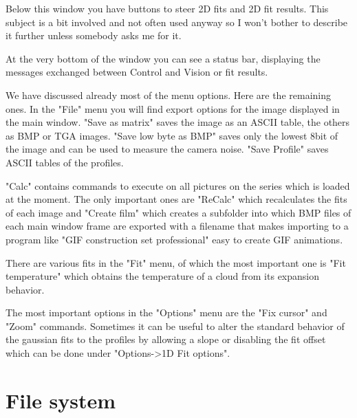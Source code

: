 \documentclass[10pt]{article}
\begin{document}
Below this window you have buttons to steer 2D fits and 2D fit
results. This subject is a bit involved and not often used anyway
so I won't bother to describe it further unless somebody asks me
for it.

At the very bottom of the window you can see a status bar,
displaying the messages exchanged between Control and Vision or
fit results.

We have discussed already most of the menu options. Here are the
remaining ones. In the "File" menu you will find export options
for the image displayed in the main window. "Save as matrix" saves
the image as an ASCII table, the others as BMP or TGA images.
"Save low byte as BMP" saves only the lowest 8bit of the image and
can be used to measure the camera noise. "Save Profile" saves
ASCII tables of the profiles.

"Calc" contains commands to execute on all pictures on the series
which is loaded at the moment. The only important ones are
"ReCalc" which recalculates the fits of each image and "Create
film" which creates a subfolder into which BMP files of each main
window frame are exported with a filename that makes importing to
a program like "GIF construction set professional" easy to create
GIF animations.

There are various fits in the "Fit" menu, of which the most
important one is "Fit temperature" which obtains the temperature
of a cloud from its expansion behavior.

The most important options in the "Options" menu are the "Fix
cursor" and "Zoom" commands. Sometimes it can be useful to alter
the standard behavior of the gaussian fits to the profiles by
allowing a slope or disabling the fit offset which can be done
under "Options->1D Fit options".

\section{File system}
\end{document}
